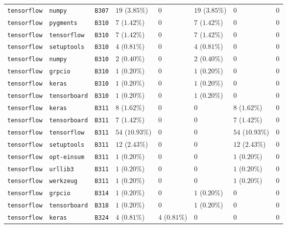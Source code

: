 \begin{table}
\begin{tabular}{llllllll}
\texttt{tensorflow} & \texttt{numpy} & \texttt{B307} & $19$ ($3.85\%$) & $0$ & $19$ ($3.85\%$) & $0$ & $0$ \\
\texttt{tensorflow} & \texttt{pygments} & \texttt{B310} & $7$ ($1.42\%$) & $0$ & $7$ ($1.42\%$) & $0$ & $0$ \\
\texttt{tensorflow} & \texttt{tensorflow} & \texttt{B310} & $7$ ($1.42\%$) & $0$ & $7$ ($1.42\%$) & $0$ & $0$ \\
\texttt{tensorflow} & \texttt{setuptools} & \texttt{B310} & $4$ ($0.81\%$) & $0$ & $4$ ($0.81\%$) & $0$ & $0$ \\
\texttt{tensorflow} & \texttt{numpy} & \texttt{B310} & $2$ ($0.40\%$) & $0$ & $2$ ($0.40\%$) & $0$ & $0$ \\
\texttt{tensorflow} & \texttt{grpcio} & \texttt{B310} & $1$ ($0.20\%$) & $0$ & $1$ ($0.20\%$) & $0$ & $0$ \\
\texttt{tensorflow} & \texttt{keras} & \texttt{B310} & $1$ ($0.20\%$) & $0$ & $1$ ($0.20\%$) & $0$ & $0$ \\
\texttt{tensorflow} & \texttt{tensorboard} & \texttt{B310} & $1$ ($0.20\%$) & $0$ & $1$ ($0.20\%$) & $0$ & $0$ \\
\texttt{tensorflow} & \texttt{keras} & \texttt{B311} & $8$ ($1.62\%$) & $0$ & $0$ & $8$ ($1.62\%$) & $0$ \\
\texttt{tensorflow} & \texttt{tensorboard} & \texttt{B311} & $7$ ($1.42\%$) & $0$ & $0$ & $7$ ($1.42\%$) & $0$ \\
\texttt{tensorflow} & \texttt{tensorflow} & \texttt{B311} & $54$ ($10.93\%$) & $0$ & $0$ & $54$ ($10.93\%$) & $0$ \\
\texttt{tensorflow} & \texttt{setuptools} & \texttt{B311} & $12$ ($2.43\%$) & $0$ & $0$ & $12$ ($2.43\%$) & $0$ \\
\texttt{tensorflow} & \texttt{opt-einsum} & \texttt{B311} & $1$ ($0.20\%$) & $0$ & $0$ & $1$ ($0.20\%$) & $0$ \\
\texttt{tensorflow} & \texttt{urllib3} & \texttt{B311} & $1$ ($0.20\%$) & $0$ & $0$ & $1$ ($0.20\%$) & $0$ \\
\texttt{tensorflow} & \texttt{werkzeug} & \texttt{B311} & $1$ ($0.20\%$) & $0$ & $0$ & $1$ ($0.20\%$) & $0$ \\
\texttt{tensorflow} & \texttt{grpcio} & \texttt{B314} & $1$ ($0.20\%$) & $0$ & $1$ ($0.20\%$) & $0$ & $0$ \\
\texttt{tensorflow} & \texttt{tensorboard} & \texttt{B318} & $1$ ($0.20\%$) & $0$ & $1$ ($0.20\%$) & $0$ & $0$ \\
\texttt{tensorflow} & \texttt{keras} & \texttt{B324} & $4$ ($0.81\%$) & $4$ ($0.81\%$) & $0$ & $0$ & $0$ \\

\end{tabular}
\end{table}
